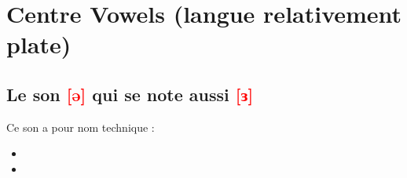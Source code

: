 \section{Centre Vowels (langue relativement plate)}\label{sec:centvow}


\subsection{Le son \textcolor{red}{[ə]} qui se note aussi \textcolor{red}{[ɜ]} }\label{sec:sonenv}

Ce son a pour nom technique :

\begin{itemize}
\item {}
\item {}
\end{itemize}

\indicsound


